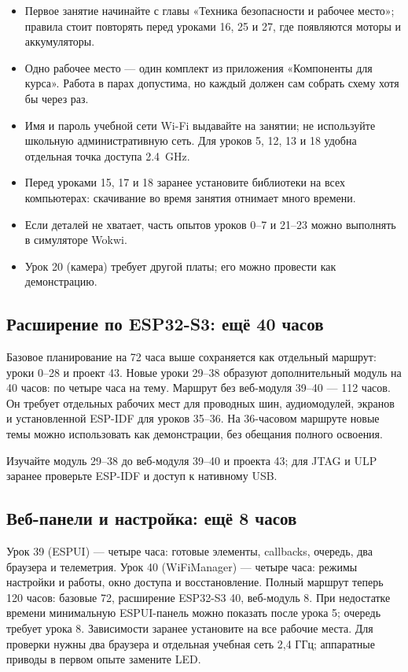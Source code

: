 \begin{itemize}
  \item Первое занятие начинайте с главы «Техника безопасности и рабочее место»; правила стоит повторять
        перед уроками 16, 25 и 27, где появляются моторы и аккумуляторы.
  \item Одно рабочее место --- один комплект из приложения «Компоненты для курса». Работа в парах
        допустима, но каждый должен сам собрать схему хотя бы через раз.
  \item Имя и пароль учебной сети Wi-Fi выдавайте на занятии; не используйте школьную административную
        сеть. Для уроков 5, 12, 13 и 18 удобна отдельная точка доступа \SI{2.4}{GHz}.
  \item Перед уроками 15, 17 и 18 заранее установите библиотеки на всех компьютерах: скачивание во время
        занятия отнимает много времени.
  \item Если деталей не хватает, часть опытов уроков 0--7 и 21--23 можно выполнять в симуляторе Wokwi.
  \item Урок 20 (камера) требует другой платы; его можно провести как демонстрацию.
\end{itemize}

\subsection*{Расширение по ESP32-S3: ещё 40 часов}
Базовое планирование на 72 часа выше сохраняется как отдельный маршрут: уроки 0--28 и проект 43.
Новые уроки 29--38 образуют дополнительный модуль на 40 часов: по четыре часа на тему.
Маршрут без веб-модуля 39--40 --- 112 часов. Он требует отдельных рабочих мест для проводных шин,
аудиомодулей, экранов и установленной ESP-IDF для уроков 35--36.
На 36-часовом маршруте новые темы можно использовать как демонстрации, без обещания полного освоения.

Изучайте модуль 29--38 до веб-модуля 39--40 и проекта 43; для JTAG и ULP заранее проверьте ESP-IDF и доступ к нативному USB.

\subsection*{Веб-панели и настройка: ещё 8 часов}
Урок 39 (ESPUI) --- четыре часа: готовые элементы, callbacks, очередь, два браузера и телеметрия.
Урок 40 (WiFiManager) --- четыре часа: режимы настройки и работы, окно доступа и восстановление.
Полный маршрут теперь 120 часов: базовые 72, расширение ESP32-S3 40, веб-модуль 8.
При недостатке времени минимальную ESPUI-панель можно показать после урока 5; очередь требует урока 8.
Зависимости заранее установите на все рабочие места. Для проверки нужны два браузера и отдельная
учебная сеть 2,4 ГГц; аппаратные приводы в первом опыте замените LED.

